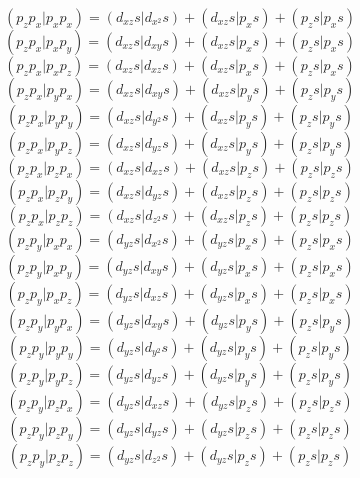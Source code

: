 \documentclass{article}
\begin{document}
\[  ( p_ { z } p_ { x } | p_ { x } p_ { x } ) = ( d_ { x z } s | d_ { x^2 } s ) + ( d_ { x z } s | p_ { x } s ) + ( p_ { z } s | p_ { x } s )  \]
\[  ( p_ { z } p_ { x } | p_ { x } p_ { y } ) = ( d_ { x z } s | d_ { x y } s ) + ( d_ { x z } s | p_ { x } s ) + ( p_ { z } s | p_ { x } s )  \]
\[  ( p_ { z } p_ { x } | p_ { x } p_ { z } ) = ( d_ { x z } s | d_ { x z } s ) + ( d_ { x z } s | p_ { x } s ) + ( p_ { z } s | p_ { x } s )  \]
\[  ( p_ { z } p_ { x } | p_ { y } p_ { x } ) = ( d_ { x z } s | d_ { x y } s ) + ( d_ { x z } s | p_ { y } s ) + ( p_ { z } s | p_ { y } s )  \]
\[  ( p_ { z } p_ { x } | p_ { y } p_ { y } ) = ( d_ { x z } s | d_ { y^2 } s ) + ( d_ { x z } s | p_ { y } s ) + ( p_ { z } s | p_ { y } s )  \]
\[  ( p_ { z } p_ { x } | p_ { y } p_ { z } ) = ( d_ { x z } s | d_ { y z } s ) + ( d_ { x z } s | p_ { y } s ) + ( p_ { z } s | p_ { y } s )  \]
\[  ( p_ { z } p_ { x } | p_ { z } p_ { x } ) = ( d_ { x z } s | d_ { x z } s ) + ( d_ { x z } s | p_ { z } s ) + ( p_ { z } s | p_ { z } s )  \]
\[  ( p_ { z } p_ { x } | p_ { z } p_ { y } ) = ( d_ { x z } s | d_ { y z } s ) + ( d_ { x z } s | p_ { z } s ) + ( p_ { z } s | p_ { z } s )  \]
\[  ( p_ { z } p_ { x } | p_ { z } p_ { z } ) = ( d_ { x z } s | d_ { z^2 } s ) + ( d_ { x z } s | p_ { z } s ) + ( p_ { z } s | p_ { z } s )  \]
\[  ( p_ { z } p_ { y } | p_ { x } p_ { x } ) = ( d_ { y z } s | d_ { x^2 } s ) + ( d_ { y z } s | p_ { x } s ) + ( p_ { z } s | p_ { x } s )  \]
\[  ( p_ { z } p_ { y } | p_ { x } p_ { y } ) = ( d_ { y z } s | d_ { x y } s ) + ( d_ { y z } s | p_ { x } s ) + ( p_ { z } s | p_ { x } s )  \]
\[  ( p_ { z } p_ { y } | p_ { x } p_ { z } ) = ( d_ { y z } s | d_ { x z } s ) + ( d_ { y z } s | p_ { x } s ) + ( p_ { z } s | p_ { x } s )  \]
\[  ( p_ { z } p_ { y } | p_ { y } p_ { x } ) = ( d_ { y z } s | d_ { x y } s ) + ( d_ { y z } s | p_ { y } s ) + ( p_ { z } s | p_ { y } s )  \]
\[  ( p_ { z } p_ { y } | p_ { y } p_ { y } ) = ( d_ { y z } s | d_ { y^2 } s ) + ( d_ { y z } s | p_ { y } s ) + ( p_ { z } s | p_ { y } s )  \]
\[  ( p_ { z } p_ { y } | p_ { y } p_ { z } ) = ( d_ { y z } s | d_ { y z } s ) + ( d_ { y z } s | p_ { y } s ) + ( p_ { z } s | p_ { y } s )  \]
\[  ( p_ { z } p_ { y } | p_ { z } p_ { x } ) = ( d_ { y z } s | d_ { x z } s ) + ( d_ { y z } s | p_ { z } s ) + ( p_ { z } s | p_ { z } s )  \]
\[  ( p_ { z } p_ { y } | p_ { z } p_ { y } ) = ( d_ { y z } s | d_ { y z } s ) + ( d_ { y z } s | p_ { z } s ) + ( p_ { z } s | p_ { z } s )  \]
\[  ( p_ { z } p_ { y } | p_ { z } p_ { z } ) = ( d_ { y z } s | d_ { z^2 } s ) + ( d_ { y z } s | p_ { z } s ) + ( p_ { z } s | p_ { z } s )  \]
\end{document}
